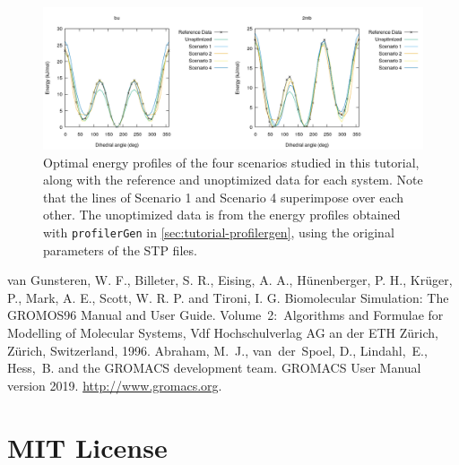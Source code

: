\documentclass[10pt,a4paper,openany]{memoir}
\numberwithin{equation}{section}
\newcommand{\profilergen}[0]{\texttt{profilerGen}}
\begin{document}
\begin{figure}[tb]
  \centering
  \includegraphics[width=\textwidth]{tutorial-profiles}
  \caption{Optimal energy profiles of the four scenarios studied in
    this tutorial, along with the reference and unoptimized data for
    each system.  Note that the lines of Scenario 1 and Scenario 4
    superimpose over each other.  The unoptimized data is from the
    energy profiles obtained with \profilergen{} in
    \autoref{sec:tutorial-profilergen}, using the original parameters
    of the STP files.}
  \label{fig:tutorial-profiles}
\end{figure}

\begin{thebibliography}{9}
 van Gunsteren, W. F., Billeter, S. R., Eising,
  A. A., Hünenberger, P. H., Krüger, P., Mark, A. E., Scott,
  W. R. P. and Tironi, I. G. Biomolecular Simulation: The GROMOS96
  Manual and User Guide. Volume~2:~Algorithms and Formulae for
  Modelling of Molecular Systems, Vdf Hochschulverlag AG an der ETH
  Zürich, Zürich, Switzerland, 1996.
 Abraham, M.~J., van~der~Spoel, D., Lindahl,~E.,
  Hess,~B. and the GROMACS development team. GROMACS User Manual
  version 2019. \url{http://www.gromacs.org}.
\end{thebibliography}

\appendix
\chapter{MIT License}
\label{appendix:MIT-license}
\end{document}
